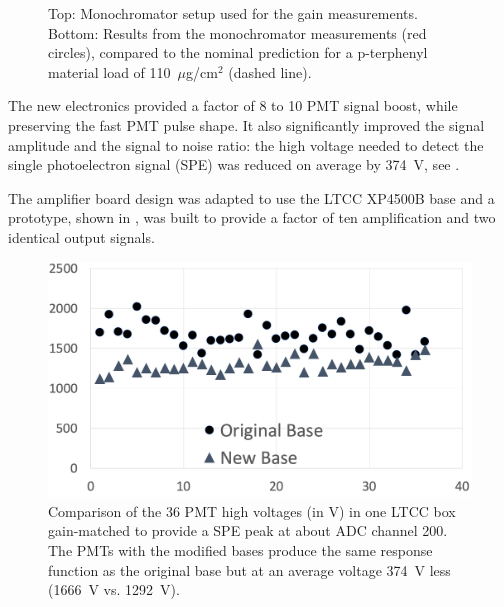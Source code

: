 \begin{figure}[H]
	\caption{Top: Monochromator setup used for the gain measurements. Bottom: Results from the monochromator
          measurements (red circles), compared to the nominal prediction for a p-terphenyl material load of
          110~$\mu$g/cm$^2$ (dashed line).}
	\label{fig:pmtTestingSetupAndptQEResults}
\end{figure}

\noindent The new electronics provided a factor of 8 to 10 PMT signal boost, while preserving the fast PMT
pulse shape. It also significantly improved the signal amplitude and the signal to noise ratio: the high voltage needed
to detect the single photoelectron signal (SPE) was reduced on average by 374~V, see .

The amplifier board design was adapted to use the LTCC XP4500B base and a prototype, shown in ,
was built to provide a factor of ten amplification and two identical output signals.

\begin{figure}
	\centering
	\includegraphics[width=0.99\columnwidth,keepaspectratio]{img/pmtHVImprovement.png}
	\caption{Comparison of the 36 PMT high voltages (in V) in one LTCC box gain-matched to provide a SPE peak at
          about ADC channel 200. The PMTs with the modified bases produce the same response function as the original
          base but at an average voltage 374~V less (1666~V vs. 1292~V).}
	\label{fig:pmtHVImprovement}
\end{figure}



